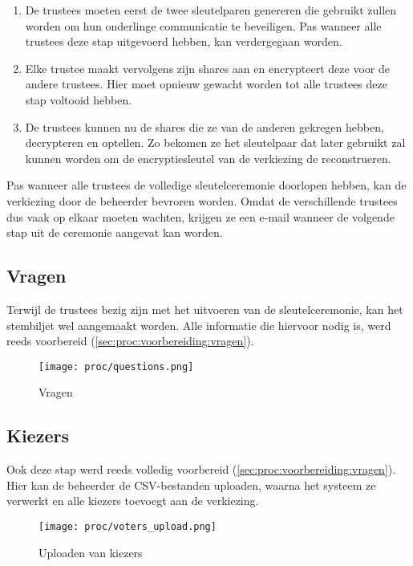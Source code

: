 \begin{enumerate}
  \item De trustees moeten eerst de twee sleutelparen genereren die gebruikt zullen worden om hun onderlinge communicatie te beveiligen. Pas wanneer alle trustees deze stap uitgevoerd hebben, kan verdergegaan worden.
  \item Elke trustee maakt vervolgens zijn shares aan en encrypteert deze voor de andere trustees. Hier moet opnieuw gewacht worden tot alle trustees deze stap voltooid hebben.
  \item De trustees kunnen nu de shares die ze van de anderen gekregen hebben, decrypteren en optellen. Zo bekomen ze het sleutelpaar dat later gebruikt zal kunnen worden om de encryptiesleutel van de verkiezing de reconstrueren.
\end{enumerate}

Pas wanneer alle trustees de volledige sleutelceremonie doorlopen hebben, kan de verkiezing door de beheerder bevroren worden. Omdat de verschillende trustees dus vaak op elkaar moeten wachten, krijgen ze een e-mail wanneer de volgende stap uit de ceremonie aangevat kan worden.

\subsection{Vragen}

Terwijl de trustees bezig zijn met het uitvoeren van de sleutelceremonie, kan het stembiljet wel aangemaakt worden. Alle informatie die hiervoor nodig is, werd reeds voorbereid (\ref{sec:proc:voorbereiding:vragen}).

\begin{figure}
  \centering
  \texttt{[image: proc/questions.png]}
  \caption{Vragen}
  \label{fig:proc:questions}
\end{figure}

\subsection{Kiezers}

Ook deze stap werd reeds volledig voorbereid (\ref{sec:proc:voorbereiding:vragen}). Hier kan de beheerder de CSV-bestanden uploaden, waarna het systeem ze verwerkt en alle kiezers toevoegt aan de verkiezing.

\begin{figure}
  \centering
  \texttt{[image: proc/voters\_upload.png]}
  \caption{Uploaden van kiezers}
  \label{fig:proc:voters_upload}
\end{figure}

